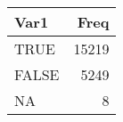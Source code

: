 
\begin{tabular}[t]{lr}
\toprule
Var1 & Freq\\
\midrule
TRUE & 15219\\
FALSE & 5249\\
NA & 8\\
\bottomrule
\end{tabular}